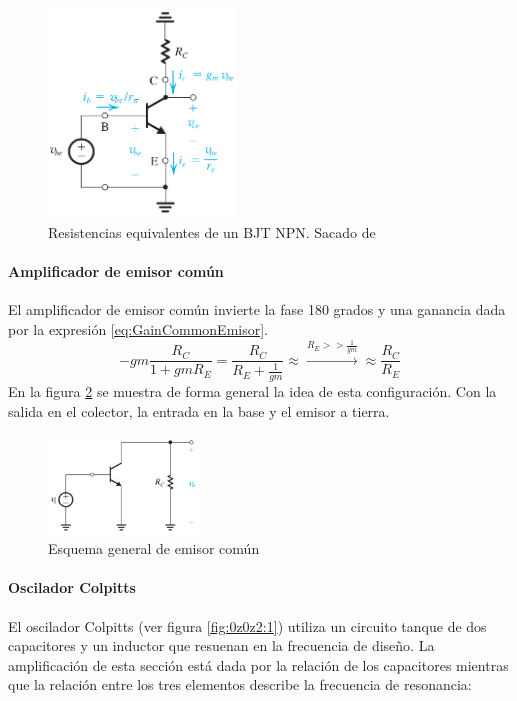 \begin{figure}[H]
    \centering
    \includegraphics[width=5cm]{Images/11.png}
    \caption{Resistencias equivalentes de un BJT NPN. Sacado de \cite{sedra}}
    \label{fig:ReqBJT}
\end{figure}

\paragraph{Amplificador de emisor común}


El amplificador de emisor común invierte la fase 180 grados y una ganancia dada por la expresión \ref{eq:GainCommonEmisor}. 
\begin{equation}
    \label{eq:GainCommonEmisor}
    -gm\frac{R_C}{1+gmR_E} = \frac{R_C}{R_E+\frac{1}{gm}} \approx \xrightarrow{R_E>>\frac1{gm}} \approx \frac{R_C}{R_E}
\end{equation}
En la figura \ref{fig:GeneralCommonEmitter} se muestra de forma general la idea de esta configuración. Con la salida en el colector, la entrada en la base y el emisor a tierra. 

\begin{figure}[H]
    \centering
    \includegraphics[width=4cm]{Images/12.png}
    \caption{Esquema general de emisor común}
    \label{fig:GeneralCommonEmitter}
\end{figure}

\paragraph{Oscilador Colpitts}
El oscilador Colpitts (ver figura \ref{fig:0z0z2:1}) utiliza un circuito tanque de dos capacitores y un inductor que resuenan en la frecuencia de diseño. La amplificación de esta sección está dada por la relación de los capacitores mientras que la relación entre los tres elementos describe la frecuencia de resonancia: 

